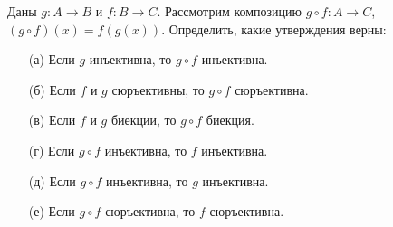 \documentclass{article}
\begin{document}
\begin{task}[2]
Даны $g : A \to B$ и $f : B \to C$. Рассмотрим композицию $g\circ f : A \to C$, $(g\circ f)(x)=f(g(x))$. Определить, какие утверждения верны:
\begin{enumerate}
    \item[(а)] Если $g$ инъективна, то $g\circ f$ инъективна.
    \item[(б)] Если $f$ и $g$ сюръективны, то $g\circ f$ сюръективна.
    \item[(в)] Если $f$ и $g$ биекции, то $g\circ f$ биекция.
    \item[(г)] Если $g\circ f$ инъективна, то $f$ инъективна.
    \item[(д)] Если $g\circ f$ инъективна, то $g$ инъективна.
    \item[(е)] Если $g\circ f$ сюръективна, то $f$ сюръективна.
\end{enumerate}
\end{task}
\end{document}
